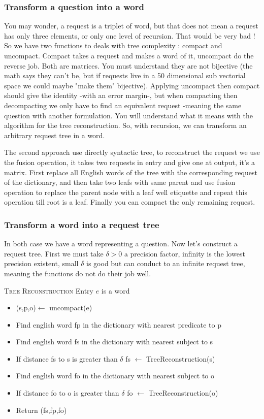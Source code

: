 \subsubsection{Transform a question into a word}

You may wonder, a request is a triplet of word, but that does not mean a request has only three elements, or only one level of recursion. That would be very bad ! So we have two functions to deals with tree complexity : compact and uncompact. Compact takes a request and makes a word of it, uncompact do the reverse job. Both are matrices. You must understand they are not bijective (the math says they can't be, but if requests live in a 50 dimensional sub vectorial space we could maybe "make them" bijective). Applying uncompact then compact should give the identity -with an error margin-, but when compacting then decompacting we only have to find an equivalent request -meaning the same question with another formulation. You will understand what it means with the algorithm for the tree reconstruction. So, with recursion, we can transform an arbitrary request tree in a word.

The second approach use directly syntactic tree, to reconstruct the request we use the fusion operation, it takes two requests in entry and give one at output, it's a matrix. First replace all English words of the tree with the corresponding request of the dictionary, and then take two leafs with same parent and use fusion operation to replace the parent node with a leaf well etiquette and repeat this operation till root is a leaf. Finally you can compact the only remaining request. 

\subsubsection{Transform a word into a request tree}

In both case we have a word representing a question. Now let's construct a request tree. First we must take $\delta>0$ a precision factor, infinity is the lowest precision existent, small $\delta$ is good but can conduct to an infinite request tree, meaning the functions do not do their job well.

\textsc{Tree Reconstruction}
Entry $e$ is a word

\begin{itemize}
\item (s,p,o)$\leftarrow$ uncompact(e)
\item Find english word fp in the dictionary with nearest predicate to p
\item Find english word fs in the dictionary with nearest subject to s
\item If distance fs to s is greater than $\delta$ fs $\leftarrow$ TreeReconstruction(s)
\item Find english word fo in the dictionary with nearest subject to o
\item If distance fo to o is greater than $\delta$ fo $\leftarrow$ TreeReconstruction(o)
\item Return (fs,fp,fo)
\end{itemize}



